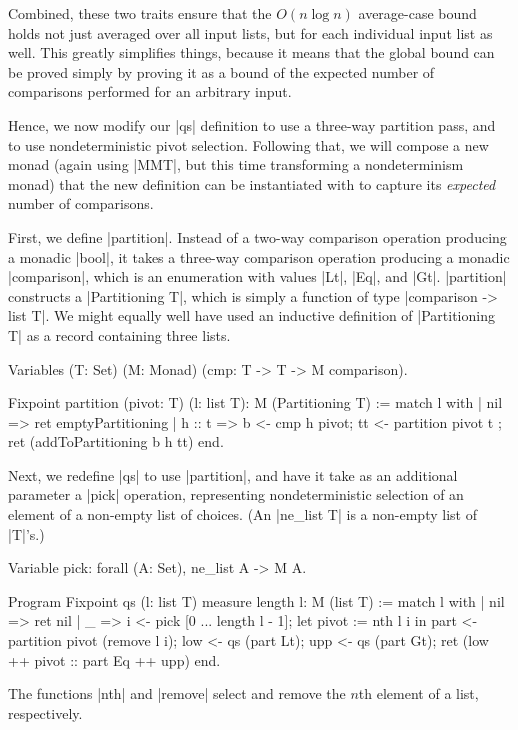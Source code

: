 \documentclass[runningheads]{llncs}
\begin{document}
Combined, these two traits ensure that the $O(n \log n)$ average-case bound holds not just averaged over all input lists, but for each individual input list as well. This greatly simplifies things, because it means that the global bound can be proved simply by proving it as a bound of the expected number of comparisons performed for an arbitrary input.

Hence, we now modify our |qs| definition to use a three-way partition pass, and to use nondeterministic pivot selection. Following that, we will compose a new monad (again using |MMT|, but this time transforming a nondeterminism monad) that the new definition can be instantiated with to capture its \emph{expected} number of comparisons.

First, we define |partition|. Instead of a two-way comparison operation producing a monadic |bool|, it takes a three-way comparison operation producing a monadic |comparison|, which is an enumeration with values |Lt|, |Eq|, and |Gt|. |partition| constructs a |Partitioning T|, which is simply a function of type |comparison -> list T|. We might equally well have used an inductive definition of |Partitioning T| as a record containing three lists. %

\parbox{\textwidth}{\begin{code}
  Variables (T: Set) (M: Monad) (cmp: T -> T -> M comparison).

  Fixpoint partition (pivot: T) (l: list T): M (Partitioning T) :=
    match l with
    | nil => ret emptyPartitioning
    | h :: t =>
        b <- cmp h pivot;
        tt <- partition pivot t ;
        ret (addToPartitioning b h tt)
    end.
\end{code}}

Next, we redefine |qs| to use |partition|, and have it take as an additional parameter a |pick| operation, representing nondeterministic selection of an element of a non-empty list of choices. (An |ne_list T| is a non-empty list of |T|'s.)

\begin{code}
  Variable pick: forall (A: Set), ne_list A -> M A.

  Program Fixpoint qs (l: list T) {measure length l}: M (list T) :=
    match l with
    | nil => ret nil
    | _ =>
        i <- pick [0 ... length l - 1];
        let pivot := nth l i in
        part <- partition pivot (remove l i);
        low <- qs (part Lt);
        upp <- qs (part Gt);
        ret (low ++ pivot :: part Eq ++ upp)
    end.
\end{code}
The functions |nth| and |remove| select and remove the $n$th element of a list, respectively.
\end{document}
